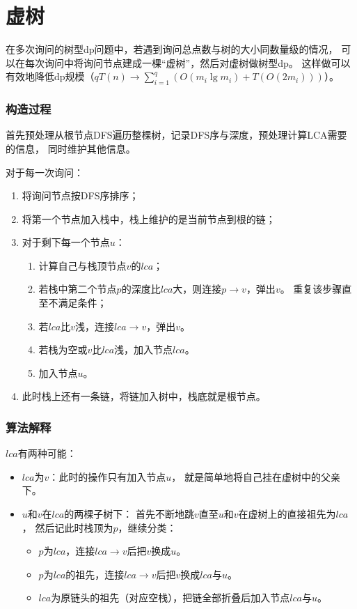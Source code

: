 \section{虚树}
在多次询问的树型dp问题中，若遇到询问总点数与树的大小同数量级的情况，
可以在每次询问中将询问节点建成一棵``虚树''，然后对虚树做树型dp。
这样做可以有效地降低dp规模（$\displaystyle qT(n)\rightarrow
\sum_{i=1}^q{\left(O(m_i\lg m_i)+T(O(2m_i))\right)}$）。

\subsubsection{构造过程}

首先预处理从根节点DFS遍历整棵树，记录DFS序与深度，预处理计算LCA需要的信息，
同时维护其他信息。

对于每一次询问：
\begin{enumerate}
    \item 将询问节点按DFS序排序；
    \item 将第一个节点加入栈中，栈上维护的是当前节点到根的链；
    \item 对于剩下每一个节点$u$：
    \begin{enumerate}
        \item 计算自己与栈顶节点$v$的$lca$；
        \item 若栈中第二个节点$p$的深度比$lca$大，则连接$p\rightarrow v$，弹出$v$。
        重复该步骤直至不满足条件；
        \item 若$lca$比$v$浅，连接$lca\rightarrow v$，弹出$v$。
        \item 若栈为空或$v$比$lca$浅，加入节点$lca$。
        \item 加入节点$u$。
    \end{enumerate}
    \item 此时栈上还有一条链，将链加入树中，栈底就是根节点。
\end{enumerate}
\subsubsection{算法解释}

$lca$有两种可能：
\begin{itemize}
    \item $lca$为$v$：此时的操作只有加入节点$u$，
    就是简单地将自己挂在虚树中的父亲下。
    \item $u$和$v$在$lca$的两棵子树下：
    首先不断地跳$v$直至$u$和$v$在虚树上的直接祖先为$lca$，
    然后记此时栈顶为$p$，继续分类：
    \begin{itemize}
        \item $p$为$lca$，连接$lca\rightarrow v$后把$v$换成$u$。
        \item $p$为$lca$的祖先，连接$lca\rightarrow v$后把$v$换成$lca$与$u$。
        \item $lca$为原链头的祖先（对应空栈），把链全部折叠后加入节点$lca$与$u$。
    \end{itemize}
\end{itemize}

